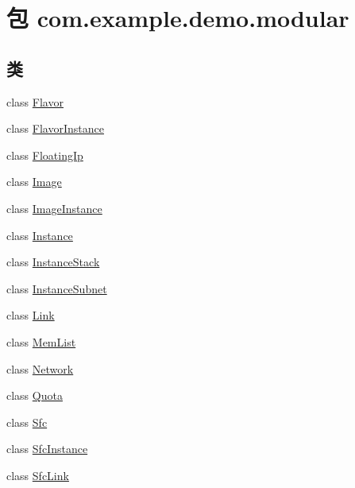 \hypertarget{namespacecom_1_1example_1_1demo_1_1modular}{}\section{包 com.\+example.\+demo.\+modular}
\label{namespacecom_1_1example_1_1demo_1_1modular}
\subsection*{类}
\begin{DoxyCompactItemize}
\item 
class \mbox{\hyperlink{classcom_1_1example_1_1demo_1_1modular_1_1_flavor}{Flavor}}
\item 
class \mbox{\hyperlink{classcom_1_1example_1_1demo_1_1modular_1_1_flavor_instance}{Flavor\+Instance}}
\item 
class \mbox{\hyperlink{classcom_1_1example_1_1demo_1_1modular_1_1_floating_ip}{Floating\+Ip}}
\item 
class \mbox{\hyperlink{classcom_1_1example_1_1demo_1_1modular_1_1_image}{Image}}
\item 
class \mbox{\hyperlink{classcom_1_1example_1_1demo_1_1modular_1_1_image_instance}{Image\+Instance}}
\item 
class \mbox{\hyperlink{classcom_1_1example_1_1demo_1_1modular_1_1_instance}{Instance}}
\item 
class \mbox{\hyperlink{classcom_1_1example_1_1demo_1_1modular_1_1_instance_stack}{Instance\+Stack}}
\item 
class \mbox{\hyperlink{classcom_1_1example_1_1demo_1_1modular_1_1_instance_subnet}{Instance\+Subnet}}
\item 
class \mbox{\hyperlink{classcom_1_1example_1_1demo_1_1modular_1_1_link}{Link}}
\item 
class \mbox{\hyperlink{classcom_1_1example_1_1demo_1_1modular_1_1_mem_list}{Mem\+List}}
\item 
class \mbox{\hyperlink{classcom_1_1example_1_1demo_1_1modular_1_1_network}{Network}}
\item 
class \mbox{\hyperlink{classcom_1_1example_1_1demo_1_1modular_1_1_quota}{Quota}}
\item 
class \mbox{\hyperlink{classcom_1_1example_1_1demo_1_1modular_1_1_sfc}{Sfc}}
\item 
class \mbox{\hyperlink{classcom_1_1example_1_1demo_1_1modular_1_1_sfc_instance}{Sfc\+Instance}}
\item 
class \mbox{\hyperlink{classcom_1_1example_1_1demo_1_1modular_1_1_sfc_link}{Sfc\+Link}}

\end{DoxyCompactItemize}

